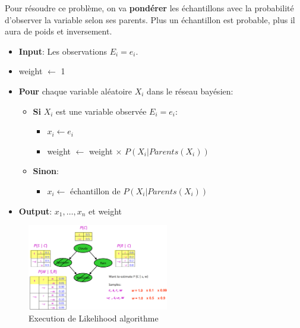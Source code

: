 Pour résoudre ce problème, on va \textbf{pondérer} les échantillons avec la probabilité d'observer la variable selon ses parents.
Plus un échantillon est probable, plus il aura de poids et inversement.

\begin{itemize}[label=\textbullet]
    \item \textbf{Input}: Les observations $E_i=e_i$. 
    \item weight $\leftarrow$ 1
    \item \textbf{Pour} chaque variable aléatoire $X_i$ dans le réseau bayésien:
        \begin{itemize}[label=\textbullet]
            \item \textbf{Si} $X_i$ est une variable observée $E_i=e_i$:
                \begin{itemize}[label=\textbullet]
                    \item $x_i \leftarrow e_i$
                    \item weight $\leftarrow$ weight $\times$ $P(X_i | Parents(X_i))$
                \end{itemize}
            \item \textbf{Sinon}:
                \begin{itemize}[label=\textbullet]
                    \item $x_i \leftarrow$ échantillon de $P(X_i | Parents(X_i))$
                \end{itemize}
        \end{itemize}
    \item \textbf{Output}: $x_1, \dots, x_n$ et weight
\end{itemize}

\begin{figure}[H]
    \begin{center}
        \includegraphics[width=0.55\textwidth]{pictures/likelihood.png}
    \end{center}
    \caption{Execution de Likelihood algorithme}\label{fig:likelihood}
\end{figure}

